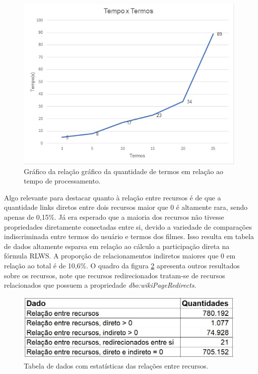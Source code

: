 \begin{figure}
	\centering
	\includegraphics[scale=0.7]{imagens/tempo_x_termos.jpg}
	\caption{Gráfico da relação gráfico da quantidade de termos em relação ao tempo de processamento.}
	\label{fig:tempo_x_termos}
\end{figure}

Algo relevante para destacar quanto à relação entre recursos é de que a quantidade links diretos entre dois recursos maior que 0 é altamente rara, sendo apenas de 0,15\%. Já era esperado que a maioria dos recursos não tivesse propriedades diretamente conectadas entre si, devido a variedade de comparações indiscriminada entre termos do usuário e termos dos filmes. Isso resulta em tabela de dados altamente esparsa em relação ao cálculo a participação direta na fórmula \ac{RLWS}. A proporção de relacionamentos indiretos maiores que 0 em relação ao total é de 10,6\%. O quadro da figura \ref{fig:lod_cache_stats} apresenta outros resultados sobre os recursos, note que recursos redirecionados tratam-se de recursos relacionados que possuem a propriedade \textit{dbo:wikiPageRedirects}.

\begin{figure}
	\centering
	\includegraphics[scale=0.5]{imagens/lod_cache_stats.jpg}
	\caption{Tabela de dados com estatísticas das relações entre recursos.}
	\label{fig:lod_cache_stats}
\end{figure}

